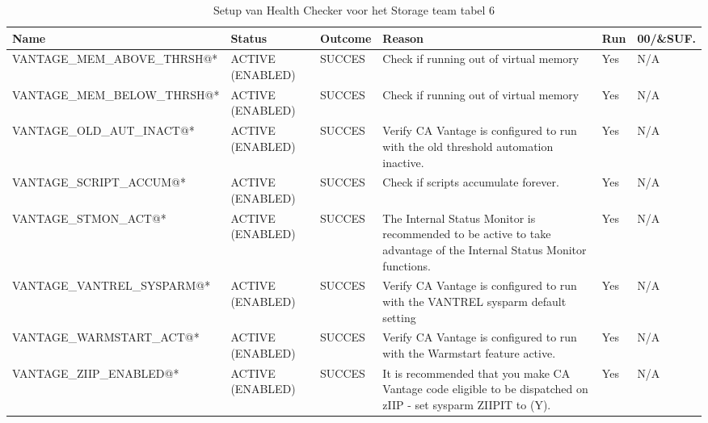 \begin{landscape}
	\begin{table}[h]
		\begin{tabular}{|l|p{2.3cm}|l|p{4.5cm}|l|l|}
			\hline
			\textbf{Name}                       & \textbf{Status}   & \textbf{Outcome} & \textbf{Reason}    & \textbf{Run} &	\textbf{00/\&SUF.} \\ \hline
			VANTAGE\_MEM\_ABOVE\_THRSH@* & ACTIVE (ENABLED) & SUCCES & Check   if running out of virtual memory                                                                                & Yes & N/A \\ \hline
			VANTAGE\_MEM\_BELOW\_THRSH@* & ACTIVE (ENABLED) & SUCCES & Check   if running out of virtual memory                                                                                & Yes & N/A \\ \hline
			VANTAGE\_OLD\_AUT\_INACT@*   & ACTIVE (ENABLED) & SUCCES & Verify   CA Vantage is configured to run with the old threshold automation   inactive.                                  & Yes & N/A \\ \hline
			VANTAGE\_SCRIPT\_ACCUM@*     & ACTIVE (ENABLED) & SUCCES & Check   if scripts accumulate forever.                                                                                  & Yes & N/A \\ \hline
			VANTAGE\_STMON\_ACT@*        & ACTIVE (ENABLED) & SUCCES & The   Internal Status Monitor is recommended to be active to take advantage of the   Internal Status Monitor functions. & Yes & N/A \\ \hline
			VANTAGE\_VANTREL\_SYSPARM@*  & ACTIVE (ENABLED) & SUCCES & Verify   CA Vantage is configured to run with the VANTREL sysparm default setting                                       & Yes & N/A \\ \hline
			VANTAGE\_WARMSTART\_ACT@*    & ACTIVE (ENABLED) & SUCCES & Verify   CA Vantage is configured to run with the Warmstart feature active.                                             & Yes & N/A \\ \hline
			VANTAGE\_ZIIP\_ENABLED@*     & ACTIVE (ENABLED) & SUCCES & It is   recommended that you make CA Vantage code eligible to be dispatched on zIIP -   set sysparm ZIIPIT to (Y).      & Yes & N/A \\ \hline
		\end{tabular}
		\caption[Health Checker Storage team tabel 6]{Setup van Health Checker voor het Storage team tabel 6}
		\label{tbl:Storage Team Tabel 6}
	\end{table}
\end{landscape}

